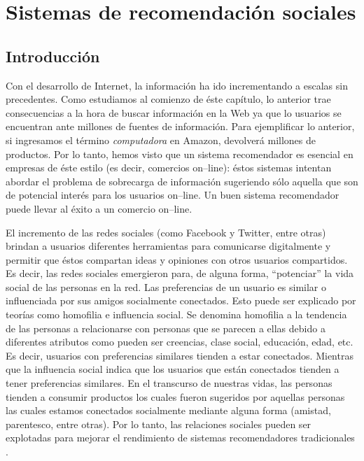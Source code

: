 \section{Sistemas de recomendación sociales}
	\subsection{Introducción}
		Con el desarrollo de Internet, la información ha ido incrementando a escalas sin precedentes. Como estudiamos al comienzo de éste capítulo, lo anterior trae consecuencias a la hora de buscar información en la Web ya que lo usuarios se encuentran ante millones de fuentes de información. Para ejemplificar lo anterior, si ingresamos el término \textit{computadora} en Amazon, devolverá millones de productos. Por lo tanto, hemos visto que un sistema recomendador es esencial en empresas de éste estilo (es decir, comercios on--line): éstos sistemas intentan abordar el problema de sobrecarga de información sugeriendo sólo aquella que son de potencial interés para los usuarios on--line. Un buen sistema recomendador puede llevar al éxito a un comercio on--line. \par
		
		El incremento de las redes sociales (como Facebook y Twitter, entre otras) brindan a usuarios diferentes herramientas para comunicarse digitalmente y permitir que éstos compartan ideas y opiniones con otros usuarios compartidos. Es decir, las redes sociales emergieron para, de alguna forma, \enquote{potenciar} la vida social de las personas en la red. Las preferencias de un usuario es similar o influenciada por sus amigos socialmente conectados. Esto puede ser explicado por teorías como homofilia e influencia social. Se denomina homofilia a la tendencia de las personas a relacionarse con personas que se parecen a ellas debido a diferentes atributos como pueden ser creencias, clase social, educación, edad, etc. Es decir, usuarios con preferencias similares tienden a estar conectados. Mientras que la influencia social indica que los usuarios que están conectados tienden a tener preferencias similares. En el transcurso de nuestras vidas, las personas tienden a consumir productos los cuales fueron sugeridos por aquellas personas las cuales estamos conectados socialmente mediante alguna forma (amistad, parentesco, entre otras). Por lo tanto, las relaciones sociales pueden ser explotadas para mejorar el rendimiento de sistemas recomendadores tradicionales \cite{tang2013}.
		
